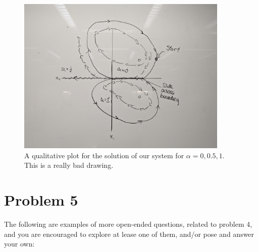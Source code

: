 \jump
\begin{figure}[!ht]
\centering
\includegraphics[width = 0.9\textwidth]{Images/qualitative plot.jpg}
\caption{A qualitative plot for the solution of our system for $\alpha = 0, 0.5, 1$. This is a really bad drawing. }
\label{png:qualitativeplot}
\end{figure}


\vspace{\floatsep}
\clearpage

\newpage
\section{Problem 5}
The following are examples of more open-ended questions, related to problem 4, and you are encouraged to explore at lease one of them, and/or pose and answer your own:


